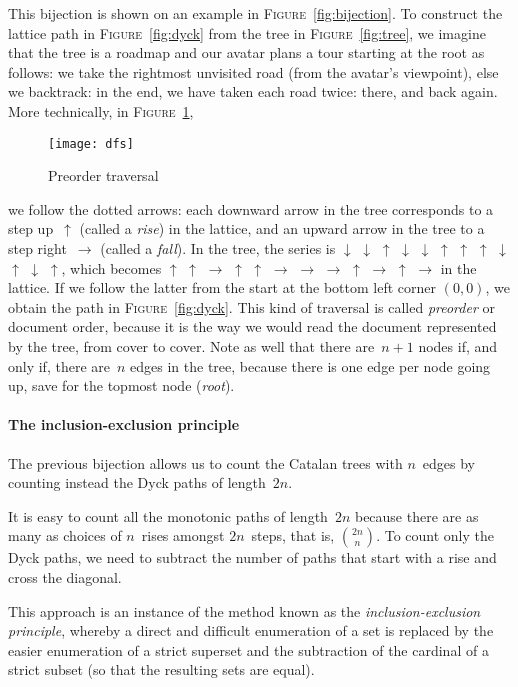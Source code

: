 \documentclass[11pt]{article}
\newcommand\fig{\textsc{Figure}}
\begin{document}
This bijection is shown on an example in \fig~\ref{fig:bijection}. To
construct the lattice path in \fig~\ref{fig:dyck} from the tree in
\fig~\ref{fig:tree}, we imagine that the tree is a roadmap and our
avatar plans a tour starting at the root as follows: we take the
rightmost unvisited road (from the avatar's viewpoint), else we
backtrack: in the end, we have taken each road twice: there, and back
again. More technically, in \fig~\ref{fig:dfs},
\begin{figure}
\centering
\texttt{[image: dfs]}
\caption{Preorder traversal \label{fig:dfs}}
\end{figure}
we follow the dotted arrows: each downward arrow in the tree
corresponds to a step up~\(\uparrow\) (called a \emph{rise}) in the
lattice, and an upward arrow in the tree to a step
right~\(\rightarrow\) (called a \emph{fall}). In the tree, the series
is \(\downarrow\) \(\downarrow\) \(\uparrow\) \(\downarrow\)
\(\downarrow\) \(\uparrow\) \(\uparrow\) \(\uparrow\) \(\downarrow\)
\(\uparrow\) \(\downarrow\) \(\uparrow\), which becomes \(\uparrow\)
\(\uparrow\) \(\rightarrow\) \(\uparrow\) \(\uparrow\) \(\rightarrow\)
\(\rightarrow\) \(\rightarrow\) \(\uparrow\) \(\rightarrow\)
\(\uparrow\) \(\rightarrow\) in the lattice. If we follow the latter
from the start at the bottom left corner \((0,0)\), we obtain the path
in \fig~\ref{fig:dyck}. This kind of traversal is called
\emph{preorder} or document order, because it is the way we would read
the document represented by the tree, from cover to cover. Note as
well that there are~\(n+1\) nodes if, and only if, there are~\(n\)
edges in the tree, because there is one edge per node going up, save
for the topmost node (\emph{root}).

\paragraph{The inclusion-exclusion principle}

The previous bijection allows us to count the Catalan trees with
\(n\)~edges by counting instead the Dyck paths of length~\(2n\). 

It is easy to count all the monotonic paths of length~\(2n\) because
there are as many as choices of \(n\)~rises amongst \(2n\)~steps, that
is, \(\binom{2n}{n}\). To count only the Dyck paths, we need to
subtract the number of paths that start with a rise and cross the
diagonal.

This approach is an instance of the method known as the
\emph{inclusion\hyp{}exclusion principle}, whereby a direct and
difficult enumeration of a set is replaced by the easier enumeration
of a strict superset and the subtraction of the cardinal of a strict
subset (so that the resulting sets are equal).
\end{document}
